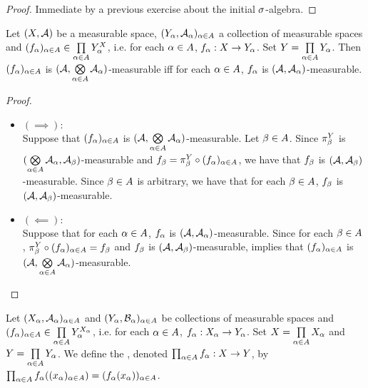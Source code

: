 \documentclass{book}
\begin{document}
	\begin{proof}
		Immediate by a previous exercise about the initial $\sigma$-algebra.
	\end{proof}

	\begin{ex} 
		Let $(X, \mathcal{A})$ be a measurable space, $(Y_{\alpha}, \mathcal{A}_{\alpha})_{\alpha \in A}$ a collection of measurable spaces and $(f_{\alpha})_{\alpha \in A} \in \prod\limits_{\alpha \in A} Y_{\alpha}^X$, i.e. for each $\alpha \in A$, $f_{\alpha}:X \rightarrow Y_{\alpha}$. Set $Y = \prod\limits_{\alpha \in A}Y_{\alpha}$. Then $(f_{\alpha})_{\alpha \in A}$ is $(\mathcal{A}, \bigotimes\limits_{\alpha \in A} \mathcal{A}_{\alpha})$-measurable iff for each $\alpha \in A$, $f_{\alpha}$ is $(\mathcal{A}, \mathcal{A}_{\alpha})$-measurable.
	\end{ex}
	
	\begin{proof}\
		\begin{itemize}
			\item $(\implies): $ \\
			Suppose that $(f_{\alpha})_{\alpha \in A}$ is $(\mathcal{A}, \bigotimes\limits_{\alpha \in A} \mathcal{A}_{\alpha})$-measurable. Let $\beta \in A$. Since $\pi_{\beta}^Y$ is $(\bigotimes\limits_{\alpha \in A} \mathcal{A}_{\alpha}, \mathcal{A}_{\beta})$-measurable and $f_{\beta} = \pi_{\beta}^Y \circ (f_{\alpha})_{\alpha \in A}$, we have that $f_{\beta}$ is $(\mathcal{A}, \mathcal{A}_{\beta})$-measurable. Since $\beta \in A$ is arbitrary, we have that for each $\beta \in A$, $f_{\beta}$ is $(\mathcal{A}, \mathcal{A}_{\beta})$-measurable.
			\item $(\impliedby): $ \\
			Suppose that for each $\alpha \in A$, $f_{\alpha}$ is $(\mathcal{A}, \mathcal{A}_{\alpha})$-measurable. Since for each $\beta \in A$, $\pi^Y_{\beta} \circ (f_{\alpha})_{\alpha \in A} = f_{\beta}$ and $f_{\beta}$ is $(\mathcal{A}, \mathcal{A}_{\beta})$-measurable,  implies that $(f_{\alpha})_{\alpha \in A}$ is $(\mathcal{A}, \bigotimes\limits_{\alpha \in A} \mathcal{A}_{\alpha})$-measurable.
		\end{itemize}
	\end{proof}
	
	\begin{defn} 
		Let $(X_{\alpha}, \mathcal{A}_{\alpha})_{\alpha \in A}$ and $(Y_{\alpha}, \mathcal{B}_{\alpha})_{\alpha \in A}$ be collections of measurable spaces and $(f_{\alpha})_{\alpha \in A} \in \prod\limits_{\alpha \in A} Y_{\alpha}^{X_{\alpha}}$, i.e. for each $\alpha \in A$, $f_{\alpha}:X_{\alpha} \rightarrow Y_{\alpha}$. Set $X = \prod\limits_{\alpha \in A} X_{\alpha}$ and $Y = \prod\limits_{\alpha \in A}Y_{\alpha}$. We define the , denoted $\prod_{\alpha \in A} f_{\alpha}: X \rightarrow Y$, by $\prod_{\alpha \in A} f_{\alpha} ((x_{\alpha})_{\alpha \in A}) = (f_{\alpha}(x_{\alpha}))_{\alpha \in A}$.
	\end{defn}
	
\end{document}
